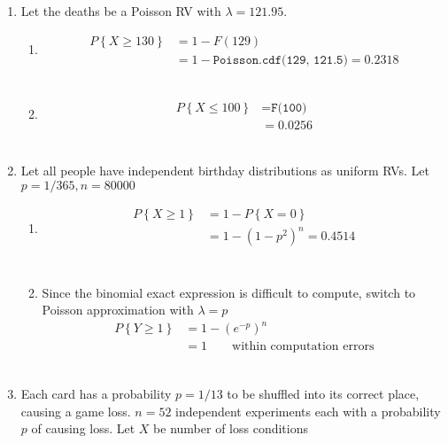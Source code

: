 \begin{enumerate}
	
	\item Let the deaths be a Poisson RV with $ \lambda = 121.95 $.
	
		\begin{enumerate}
			\item 
			\begin{align}
				P \left\{X \geq 130\right\} &= 1 - F(129) \nonumber \\
				&= 1 - \texttt{Poisson.cdf(129, 121.5)} = 0.2318
			\end{align}\\
			
			\item 
			\begin{align}
				P \left\{X \leq 100\right\} &= \texttt{F(100)} \nonumber \\
				&= 0.0256
			\end{align}\\
			
		\end{enumerate}
	 
	
	\item Let all people have independent birthday distributions as uniform RVs. Let $ p = 1/365 , n = 80000$
	
		\begin{enumerate}
			\item 
			\begin{align}
				P \left\{X \geq 1\right\} &= 1 - P\left\{X = 0\right\} \nonumber \\
				&= 1 - (1-p^2)^n = 0.4514 \\
			\end{align}\\
			
			\item Since the binomial exact expression is difficult to compute, switch to Poisson approximation with $ \lambda = p $\\
			\begin{align}
				P \left\{Y \geq 1\right\} &= 1 - (e^{-p})^n \nonumber \\
				&= 1 \qquad \text{within computation errors}
			\end{align}\\
			
		\end{enumerate}
	 
	
	\item Each card has a probability $ p = 1/13 $ to be shuffled into its correct place, causing a game loss. $ n = 52 $ independent experiments each with a probability $ p $ of causing loss. Let $ X $ be number of loss conditions \\
	

\end{enumerate}
